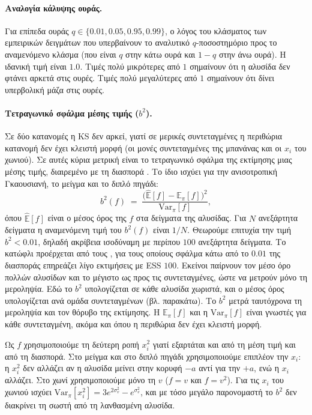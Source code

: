 \paragraph{Αναλογία κάλυψης ουράς.}
Για επίπεδα ουράς $q \in \{0.01, 0.05, 0.95, 0.99\}$, ο λόγος του κλάσματος των εμπειρικών
δειγμάτων που υπερβαίνουν το αναλυτικό $q$-ποσοστημόριο προς το
αναμενόμενο κλάσμα (που είναι $q$ στην κάτω ουρά και $1{-}q$ στην άνω ουρά).
Η ιδανική τιμή είναι $1.0$. Τιμές πολύ μικρότερες από $1$ σημαίνουν ότι η
αλυσίδα δεν φτάνει αρκετά στις ουρές. Τιμές πολύ μεγαλύτερες από $1$ σημαίνουν
ότι δίνει υπερβολική μάζα στις ουρές.

\paragraph{Τετραγωνικό σφάλμα μέσης τιμής ($b^2$).}
Σε δύο κατανομές η KS δεν αρκεί, γιατί σε μερικές συντεταγμένες η περιθώρια
κατανομή δεν έχει κλειστή μορφή (οι μονές συντεταγμένες της μπανάνας και οι $x_i$
του χωνιού). Σε αυτές κύρια μετρική είναι το τετραγωνικό σφάλμα της εκτίμησης μιας μέσης τιμής, διαιρεμένο
με τη διασπορά \citep{hoffman2022tuning}. Το ίδιο ισχύει για την ανισοτροπική
Γκαουσιανή, το μείγμα και το διπλό πηγάδι:
\begin{equation}
  b^2(f) \;=\; \frac{\bigl(\hat{\mathbb{E}}[f] - \mathbb{E}_\pi[f]\bigr)^2}{\mathrm{Var}_\pi[f]},
  \label{eq:b2}
\end{equation}
όπου $\hat{\mathbb{E}}[f]$ είναι ο μέσος όρος της $f$ στα δείγματα της αλυσίδας.
Για $N$ ανεξάρτητα δείγματα η αναμενόμενη τιμή του $b^2(f)$ είναι $1/N$.
Θεωρούμε επιτυχία την τιμή $b^2 < 0.01$, δηλαδή ακρίβεια ισοδύναμη με περίπου $100$ ανεξάρτητα δείγματα.
Το κατώφλι προέρχεται από τους \citet{hoffman2022tuning}, για τους οποίους σφάλμα κάτω
από το $0.01$ της διασποράς επηρεάζει λίγο εκτιμήσεις με ESS $100$. Εκείνοι παίρνουν τον
μέσο όρο πολλών αλυσίδων και το μέγιστο ως προς τις συντεταγμένες, ώστε να μετρούν μόνο
τη μεροληψία. Εδώ το $b^2$ υπολογίζεται σε κάθε αλυσίδα χωριστά, και ο μέσος όρος
υπολογίζεται ανά ομάδα συντεταγμένων (βλ. παρακάτω).
Το $b^2$ μετρά ταυτόχρονα τη
μεροληψία και τον θόρυβο της εκτίμησης. Η $\mathbb{E}_\pi[f]$ και η
$\mathrm{Var}_\pi[f]$ είναι γνωστές για κάθε συντεταγμένη, ακόμα και όπου η
περιθώρια δεν έχει κλειστή μορφή.

Ως $f$ χρησιμοποιούμε τη δεύτερη ροπή $x_i^2$
γιατί εξαρτάται και από τη μέση τιμή και από τη διασπορά. Στο μείγμα και στο διπλό
πηγάδι χρησιμοποιούμε επιπλέον την $x_i$: η $x_i^2$ δεν αλλάζει αν η αλυσίδα μείνει
στην κορυφή $-a$ αντί για την $+a$, ενώ η $x_i$ αλλάζει. Στο χωνί χρησιμοποιούμε μόνο
τη $v$ ($f = v$ και $f = v^2$). Για τις $x_i$ του χωνιού ισχύει
$\mathrm{Var}_\pi[x_i^2] = 3e^{2\sigma_v^2} - e^{\sigma_v^2}$, και με τόσο μεγάλο
παρονομαστή το $b^2$ δεν διακρίνει τη σωστή από τη λανθασμένη αλυσίδα.

